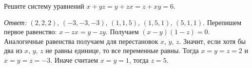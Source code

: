 Решите систему уравнений $x + y z = y + z x = z + x y = 6$.

\solution
\emph{Ответ:} $(2,2,2)$, $(-3,-3,-3)$, $(1,1,5)$, $(1,5,1)$, $(5,1,1)$.
Перепишем первое равенство: $x - z x = y - z y$.
Получаем $(x - y)(1 - z) = 0$.
Аналогичные равенства получаем для перестановок $x$, $y$, $z$.
Значит, если хотя бы два из $x$, $y$, $z$ не равны единице, то все переменные
равны.
Тогда $x = y = z = 2$ и $x = y = z = -3$.
Иначе считаем $x = y = 1$, тогда $z = 5$.

